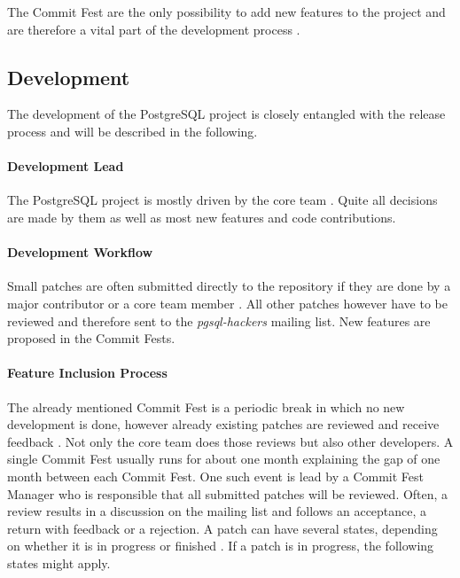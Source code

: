 The Commit Fest are the only possibility to add new features to the project and
are therefore a vital part of the development process
\cite{PostgreSQLDevelopment,PostgreSQLCommitFest}. 

\subsection{Development}

The development of the PostgreSQL project is closely entangled with the release
process and will be described in the following.

\paragraph{Development Lead}

The PostgreSQL project is mostly driven by the core team
\cite{PostgreSQLDevFAQ,PostgreSQLFAQ,PostgreSQLContributors}. Quite all
decisions are made by them as well as most new features and code contributions.

\paragraph{Development Workflow}

Small patches are often submitted directly to the repository if they are done
by a major contributor or a core team member \cite{PostgreSQLDevFAQ}. All other
patches however have to be reviewed and therefore sent to the
\emph{pgsql-hackers} mailing list. New features are proposed in the Commit
Fests.

\paragraph{Feature Inclusion Process}

The already mentioned Commit Fest is a periodic break in which no new
development is done, however already existing patches are reviewed and receive
feedback \cite{PostgreSQLCommitFest}. Not only the core team does those reviews
but also other developers. A single Commit Fest usually runs for about one
month explaining the gap of one month between each Commit Fest. One such event
is lead by a Commit Fest Manager who is responsible that all submitted patches
will be reviewed. Often, a review results in a discussion on the mailing list
and follows an acceptance, a return with feedback or a rejection. A patch can
have several states, depending on whether it is in progress or finished
\cite{PostgreSQLCommitFestRunning}. If a patch is in progress, the following
states might apply.

